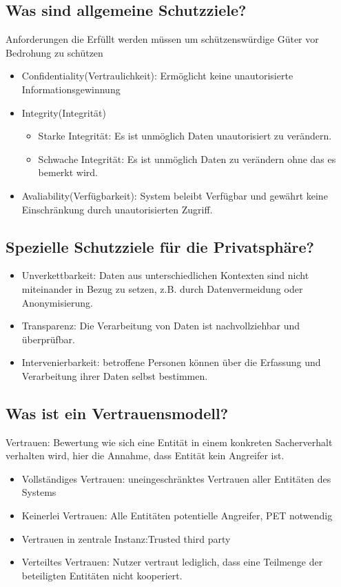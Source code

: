 	\subsection{Was sind allgemeine Schutzziele?}
	Anforderungen die Erfüllt werden müssen um schützenswürdige Güter vor Bedrohung zu schützen
	\begin{itemize}
		\item Confidentiality(Vertraulichkeit): Ermöglicht keine unautorisierte Informationsgewinnung
		\item Integrity(Integrität)
		\begin{itemize}
			\item Starke Integrität: Es ist unmöglich Daten unautorisiert zu verändern.
			\item Schwache Integrität: Es ist unmöglich Daten zu verändern ohne das es bemerkt wird.			
		\end{itemize}
		\item Avaliability(Verfügbarkeit): System beleibt Verfügbar und gewährt keine Einschränkung durch unautorisierten Zugriff.
	\end{itemize}

	\subsection{Spezielle Schutzziele für die Privatsphäre?}
	\begin{itemize}
		\item Unverkettbarkeit: Daten aus unterschiedlichen Kontexten sind nicht miteinander in Bezug zu setzen, z.B. durch Datenvermeidung oder Anonymisierung.
		\item Transparenz: Die Verarbeitung von Daten ist nachvollziehbar und überprüfbar. 
		\item Intervenierbarkeit: betroffene Personen können über die Erfassung und Verarbeitung ihrer Daten selbst bestimmen.
		
\end{itemize}		
	
	\subsection{Was ist ein Vertrauensmodell?}
	Vertrauen: Bewertung wie sich eine Entität in einem konkreten Sacherverhalt verhalten wird, hier die Annahme, dass Entität kein Angreifer ist.
	\begin{itemize}
		\item Vollständiges Vertrauen: uneingeschränktes Vertrauen aller Entitäten des Systems
		\item Keinerlei Vertrauen: Alle Entitäten potentielle Angreifer, PET notwendig
		\item Vertrauen in zentrale Instanz:Trusted third party
		\item Verteiltes Vertrauen: Nutzer vertraut lediglich, dass eine Teilmenge der beteiligten Entitäten nicht kooperiert.
		
	\end{itemize}
